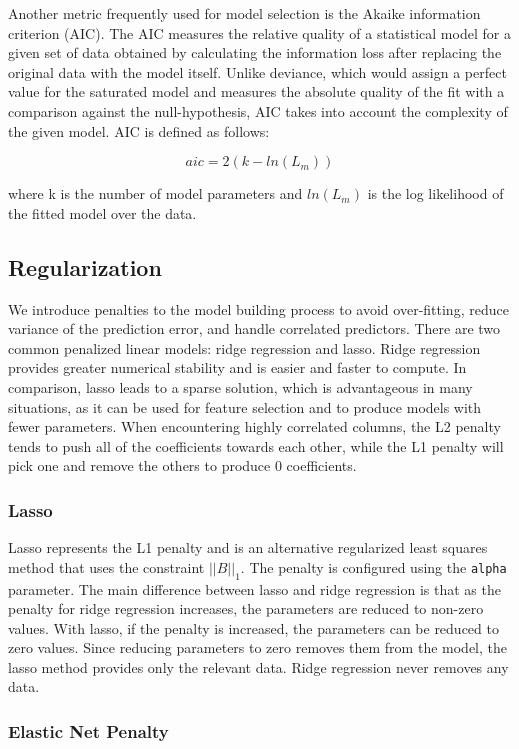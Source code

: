 \documentclass{article}[11pt]
\begin{document}
Another metric frequently used for model selection is the Akaike information criterion (AIC). The AIC measures the relative quality of a statistical model for a given set of data obtained by calculating the information loss after replacing the original data with the model itself. Unlike deviance, which would assign a perfect value for the saturated model and measures the absolute quality of the fit with a comparison against the null-hypothesis, AIC takes into account the complexity of the given model. AIC is defined as follows:

\[ aic = 2(k - ln(L_{m}))\]

\noindent
where k is the number of model parameters and $ln(L_{m})$ is the log likelihood of the fitted model over the data.


\subsection{Regularization} 
We introduce penalties to the model building process to avoid over-fitting, reduce variance of the prediction error, and handle correlated predictors. There are two common penalized linear models: ridge regression and lasso. Ridge regression provides greater numerical stability and is easier and faster to compute. In comparison, lasso leads to a sparse solution, which is advantageous in many situations, as it can be used for feature selection and to produce models with fewer parameters. When encountering highly correlated columns, the L2 penalty tends to push all of the coefficients towards each other, while the L1 penalty will pick one and remove the others to produce 0 coefficients.

\subsubsection{Lasso}

Lasso represents the L1 penalty and is an alternative regularized least squares method that uses the constraint $||B||_1$. The penalty is configured using the \texttt{alpha} parameter. The main difference between lasso and ridge regression is that as the penalty for ridge regression increases, the parameters are reduced to non-zero values. With lasso, if the penalty is increased, the parameters can be reduced to zero values. Since reducing parameters to zero removes them from the model, the lasso method provides only the relevant data. Ridge regression never removes any data. 

\subsubsection{Elastic Net Penalty}
\end{document}

